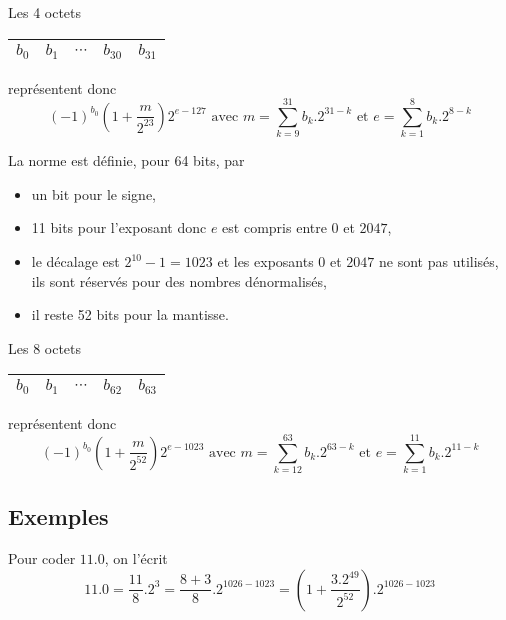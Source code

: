 Les 4 octets \begin{tabular}{|l|l|l|l|l|}
$b_0$&$b_1$&$\cdots$&$b_{30}$&$b_{31}$\\ 
\hline \end{tabular} représentent donc 
\[(-1)^{b_0}\left(1 + \frac m{2^{23}}\right)2^{e-127}\text{ avec }m = \sum_{k=9}^{31} b_k.2^{31-k}\text{ et } e=\sum_{k=1}^{8} b_k.2^{8-k}\]

\medskip

La norme est définie, pour 64 bits, par
\begin{itemize}
\item un bit pour le signe, 
\item 11 bits pour l'exposant donc $e$ est compris entre 0 et $2047$,
\item le décalage est $2^{10}-1=1023$ et les exposants 0 et $2047$ ne sont pas utilisés, ils sont réservés pour des nombres dénormalisés,
\item il reste 52 bits pour la mantisse.
\end{itemize}
\medskip

Les 8 octets \begin{tabular}{|l|l|l|l|l|}
$b_0$&$b_1$&$\cdots$&$b_{62}$&$b_{63}$\\ 
\hline \end{tabular} représentent donc 
\[(-1)^{b_0}\left(1 + \frac m{2^{52}}\right)2^{e-1023}\text{ avec }m = \sum_{k=12}^{63} b_k.2^{63-k}\text{ et } e=\sum_{k=1}^{11} b_k.2^{11-k}\]
\subsection{Exemples}
Pour coder  $11.0$, on l'écrit 
\[11.0 = \frac{11}8.2^3  = \frac{8+3}8.2^{1026-1023} = \left(1 + \frac{3.2^{49}}{2^{52}}\right).2^{1026-1023}\] 

